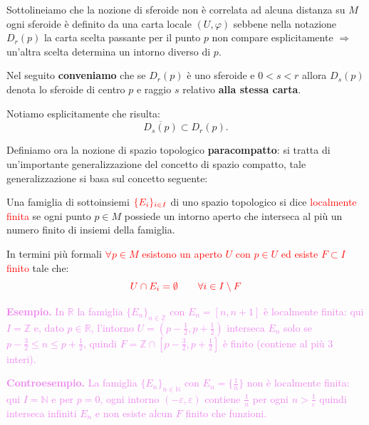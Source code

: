         \begin{osservazione}
        \mbox{}

        Sottolineiamo che la nozione di sferoide non è correlata ad alcuna distanza su $M$ ogni sferoide è definito da una carta locale
        $(U, \varphi)$ sebbene nella notazione $D_r(p)$ la carta scelta passante per il punto $p$ non compare esplicitamente $\Rightarrow$ 
        un'altra scelta determina un intorno diverso di $p$. 
        
        Nel seguito \textbf{conveniamo} che se $D_r(p)$ è uno sferoide e $0 < s < r$ allora $D_s(p)$ denota lo sferoide di centro $p$ e raggio $s$ relativo \textbf{alla stessa carta}. 
        
        Notiamo esplicitamente che risulta:
        \[
        \overline{D_s(p)} \subset D_r(p).
        \]
        \end{osservazione}

        \newpage
        Definiamo ora la nozione di spazio topologico \textbf{paracompatto}: si tratta di un'importante generalizzazione del concetto di
         spazio compatto, tale generalizzazione si basa sul concetto seguente:

        \begin{definizione}
        \label{def:famiglia_localmente_finita}
        \mbox{}

        Una famiglia di sottoinsiemi $\textcolor{red}{\{E_i\}_{i \in I}}$ di uno spazio topologico si
        dice \textcolor{red}{localmente finita} se ogni punto $p \in M$ possiede un intorno aperto che interseca al più un numero finito di insiemi della famiglia. 
         
        In termini più formali \textcolor{red}{$\forall p \in M$ esistono un aperto $U$ con $p \in U$ ed esiste $F \subset I$ finito} tale che:
        \[
        \textcolor{red}{U \cap E_i = \emptyset \qquad \forall i \in I \setminus F}
        \]
        \end{definizione}
        \textcolor{violet}{
        \textbf{Esempio.} In $\mathbb{R}$ la famiglia $\{E_n\}_{n \in \mathbb{Z}}$ con $E_n = [n, n+1]$ è localmente finita: qui 
        $I = \mathbb{Z}$ e, dato $p \in \mathbb{R}$, l'intorno $U = (p-\tfrac12, p+\tfrac12)$ interseca $E_n$ solo se 
        $p-\tfrac32 \leq n \leq p+\tfrac12$, quindi $F = \mathbb{Z} \cap [p-\tfrac32, p+\tfrac12]$ è finito (contiene al più $3$ interi).}

        \textcolor{violet}{\textbf{Controesempio.} La famiglia $\{E_n\}_{n \in \mathbb{N}}$ con $E_n = \{\tfrac{1}{n}\}$ non è localmente finita: qui
        $I = \mathbb{N}$ e per $p = 0$, ogni intorno $(-\varepsilon, \varepsilon)$ contiene $\tfrac{1}{n}$ per ogni
        $n > \tfrac{1}{\varepsilon}$ quindi interseca infiniti $E_n$ e non esiste alcun $F$ finito che funzioni.}

